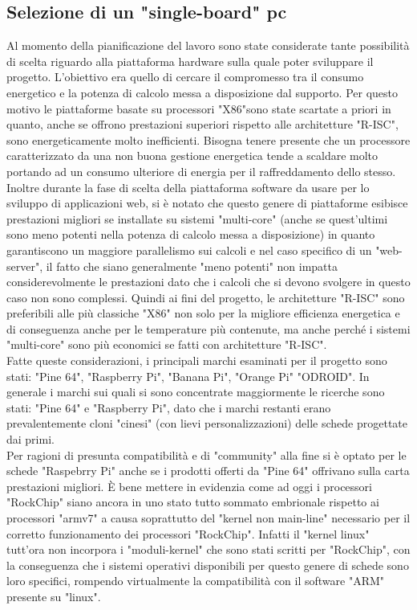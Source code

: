 \subsection{Selezione di un "single-board" pc}
\raggedright
Al momento della pianificazione del lavoro sono state considerate tante possibilità di scelta riguardo alla piattaforma hardware sulla quale poter sviluppare il progetto. L'obiettivo era quello di cercare il compromesso tra il consumo energetico e la potenza di calcolo messa a disposizione dal supporto. Per questo motivo le piattaforme basate su processori "X86"sono state scartate a priori in quanto, anche se offrono prestazioni superiori rispetto alle architetture "R-ISC", sono energeticamente molto inefficienti. Bisogna tenere presente che un processore caratterizzato da una non buona gestione energetica tende a scaldare molto portando ad un consumo ulteriore di energia per il raffreddamento dello stesso.  Inoltre durante la fase di scelta della piattaforma software da usare per lo sviluppo di applicazioni web, si è notato che questo genere di piattaforme esibisce prestazioni migliori se installate su sistemi "multi-core" (anche se quest'ultimi sono meno potenti nella potenza di calcolo messa a disposizione) in quanto garantiscono un maggiore parallelismo sui calcoli e nel caso specifico di un "web-server", il fatto che siano generalmente "meno potenti" non impatta considerevolmente le prestazioni dato che i calcoli che si devono svolgere in questo caso non sono complessi. Quindi ai fini del progetto, le architetture "R-ISC" sono preferibili alle più classiche "X86" non solo per la migliore efficienza energetica e di conseguenza anche per le temperature più contenute, ma anche perché i sistemi "multi-core" sono più economici se fatti con architetture "R-ISC".\\
Fatte queste considerazioni, i principali marchi esaminati per il progetto sono stati: "Pine 64", "Raspberry Pi", "Banana Pi", "Orange Pi" "ODROID". In generale i marchi sui quali si sono concentrate maggiormente le ricerche sono stati: "Pine 64" e "Raspberry Pi", dato che i marchi restanti erano prevalentemente cloni "cinesi" (con lievi personalizzazioni) delle schede progettate dai primi.\\
Per ragioni di presunta compatibilità e di "community" alla fine si è optato per le schede "Raspebrry Pi" anche se i prodotti offerti da "Pine 64" offrivano sulla carta prestazioni migliori. È bene mettere in evidenzia come ad oggi i processori "RockChip" siano ancora in uno stato tutto sommato embrionale rispetto ai processori "armv7"  a causa soprattutto del "kernel non main-line" necessario per il corretto funzionamento dei processori "RockChip". Infatti il "kernel linux" tutt'ora non incorpora i "moduli-kernel" che sono stati scritti per "RockChip", con la conseguenza che i sistemi operativi disponibili per questo genere di schede sono loro specifici, rompendo virtualmente la compatibilità con il software "ARM" presente su "linux".\\
